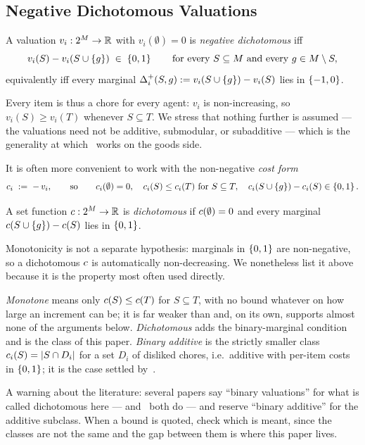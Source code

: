 \subsection{Negative Dichotomous Valuations}
\label{sec:negdich}

\begin{definition}
\label{def:negdich}
A valuation $v_i : 2^{M} \to \mathbb{R}$ with $v_i(\emptyset) = 0$ is
\emph{negative dichotomous} iff
\[
  v_i(S) - v_i(S \cup \left\{g\right\}) \;\in\; \left\{0,1\right\}
  \qquad \text{for every } S \subseteq M \text{ and every }
  g \in M \setminus S,
\]
equivalently iff every marginal $\Delta^{+}_{i}(S,g) :=
v_i(S \cup \left\{g\right\}) - v_i(S)$ lies in $\left\{-1,0\right\}$.
\end{definition}

Every item is thus a chore for every agent: $v_i$ is non-increasing, so
$v_i(S) \ge v_i(T)$ whenever $S \subseteq T$. We stress that nothing further is
assumed --- the valuations need not be additive, submodular, or subadditive ---
which is the generality at which~\cite{BKNS22} works on the goods side.

It is often more convenient to work with the non-negative \emph{cost form}
\[
  c_i \;:=\; -\,v_i, \qquad\text{so}\qquad
  c_i(\emptyset) = 0, \quad
  c_i(S) \le c_i(T) \text{ for } S \subseteq T, \quad
  c_i(S \cup \left\{g\right\}) - c_i(S) \in \left\{0,1\right\}.
\]
\begin{definition}
\label{def:dichcost}
A set function $c : 2^{M} \to \mathbb{R}$ is \emph{dichotomous} if
$c(\emptyset) = 0$ and every marginal $c(S \cup \left\{g\right\}) - c(S)$
lies in $\left\{0,1\right\}$.
\end{definition}

Monotonicity is not a separate hypothesis: marginals in $\left\{0,1\right\}$ are
non-negative, so a dichotomous $c$ is automatically non-decreasing. We
nonetheless list it above because it is the property most often used directly.

\ifworking
\begin{remark}
\label{rem:terminology}
\emph{Monotone} means only $c(S) \le c(T)$ for $S \subseteq T$, with no
bound whatever on how large an increment can be; it is far weaker than
 and, on its own, supports almost none of the arguments
below. \emph{Dichotomous} adds the binary-marginal condition and is the class of
this paper. \emph{Binary additive} is the strictly smaller class
$c_i(S) = \left\lvert S \cap D_i\right\rvert$ for a set $D_i$ of disliked chores, i.e.\
additive with per-item costs in $\left\{0,1\right\}$; it is the case settled
by~\cite{LMS26}.

A warning about the literature: several papers say ``binary valuations'' for
what is called dichotomous here --- \cite{BSY23} and~\cite{TWYZ23} both do ---
and reserve ``binary additive'' for the additive subclass. When a bound is
quoted, check which is meant, since the classes are not the same and the gap
between them is where this paper lives.
\end{remark}
\fi

